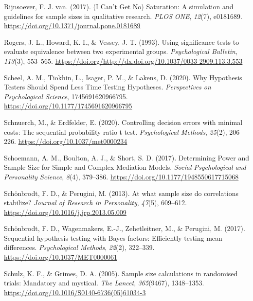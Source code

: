 \documentclass[
  english,
  ,jou, a4paper,floatsintext]{apa6}
\newlength{\cslhangindent}
\newenvironment{cslreferences}%
  {\setlength{\parindent}{0pt}%
  \everypar{\setlength{\hangindent}{\cslhangindent}}\ignorespaces}%
  {\par}
\begin{document}
\begin{cslreferences}
\leavevmode\hypertarget{ref-rijnsoever_i_2017}{}%
Rijnsoever, F. J. van. (2017). (I Can't Get No) Saturation: A simulation and guidelines for sample sizes in qualitative research. \emph{PLOS ONE}, \emph{12}(7), e0181689. \url{https://doi.org/10.1371/journal.pone.0181689}

\leavevmode\hypertarget{ref-rogers_using_1993}{}%
Rogers, J. L., Howard, K. I., \& Vessey, J. T. (1993). Using significance tests to evaluate equivalence between two experimental groups. \emph{Psychological Bulletin}, \emph{113}(3), 553--565. \url{https://doi.org/http://dx.doi.org/10.1037/0033-2909.113.3.553}

\leavevmode\hypertarget{ref-scheel_why_2020}{}%
Scheel, A. M., Tiokhin, L., Isager, P. M., \& Lakens, D. (2020). Why Hypothesis Testers Should Spend Less Time Testing Hypotheses. \emph{Perspectives on Psychological Science}, 1745691620966795. \url{https://doi.org/10.1177/1745691620966795}

\leavevmode\hypertarget{ref-schnuerch_controlling_2020}{}%
Schnuerch, M., \& Erdfelder, E. (2020). Controlling decision errors with minimal costs: The sequential probability ratio t test. \emph{Psychological Methods}, \emph{25}(2), 206--226. \url{https://doi.org/10.1037/met0000234}

\leavevmode\hypertarget{ref-schoemann_determining_2017}{}%
Schoemann, A. M., Boulton, A. J., \& Short, S. D. (2017). Determining Power and Sample Size for Simple and Complex Mediation Models. \emph{Social Psychological and Personality Science}, \emph{8}(4), 379--386. \url{https://doi.org/10.1177/1948550617715068}

\leavevmode\hypertarget{ref-schonbrodt_at_2013}{}%
Schönbrodt, F. D., \& Perugini, M. (2013). At what sample size do correlations stabilize? \emph{Journal of Research in Personality}, \emph{47}(5), 609--612. \url{https://doi.org/10.1016/j.jrp.2013.05.009}

\leavevmode\hypertarget{ref-schonbrodt_sequential_2017}{}%
Schönbrodt, F. D., Wagenmakers, E.-J., Zehetleitner, M., \& Perugini, M. (2017). Sequential hypothesis testing with Bayes factors: Efficiently testing mean differences. \emph{Psychological Methods}, \emph{22}(2), 322--339. \url{https://doi.org/10.1037/MET0000061}

\leavevmode\hypertarget{ref-schulz_sample_2005}{}%
Schulz, K. F., \& Grimes, D. A. (2005). Sample size calculations in randomised trials: Mandatory and mystical. \emph{The Lancet}, \emph{365}(9467), 1348--1353. \url{https://doi.org/10.1016/S0140-6736(05)61034-3}


\end{cslreferences}
\end{document}
